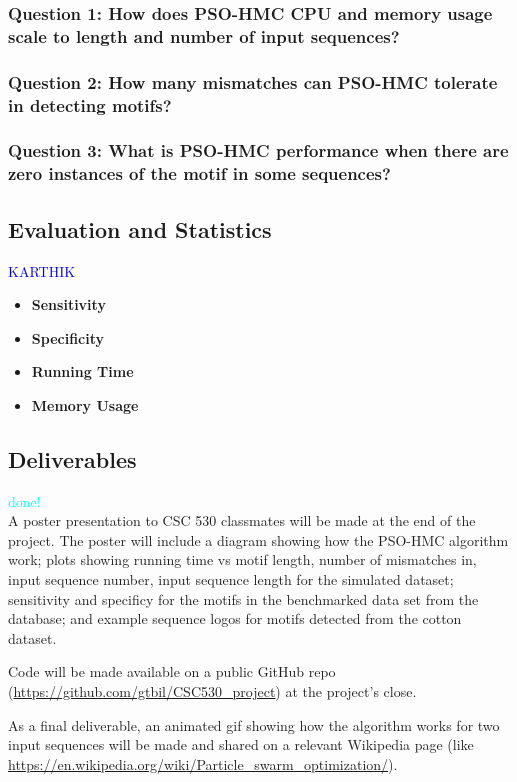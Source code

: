 \documentclass{article}
\begin{document}
\subsubsection{Question 1: How does PSO-HMC CPU and memory usage scale to length and number of input sequences?}
\subsubsection{Question 2: How many mismatches can PSO-HMC tolerate in detecting motifs?}
\subsubsection{Question 3: What is PSO-HMC performance when there are zero instances of the motif in some sequences?}
\subsection{Evaluation and Statistics}
\textcolor{blue}{KARTHIK} \\
\begin{itemize}
	\item \textbf{Sensitivity}
	\item \textbf{Specificity}
	\item \textbf{Running Time}
	\item \textbf{Memory Usage}
\end{itemize}
\subsection{Deliverables}
\textcolor{cyan}{done!} \\
A poster presentation to CSC 530 classmates will be made at the end of the project. The poster will include a diagram showing how the PSO-HMC algorithm work; plots showing running time vs motif length, number of mismatches in, input sequence number, input sequence length for the simulated dataset; sensitivity and specificy for the motifs in the benchmarked data set from the database; and example sequence logos for motifs detected from the cotton dataset.  
  
  Code will be made available on a public GitHub repo (\url{https://github.com/gtbil/CSC530_project}) at the project's close.  
  
  As a final deliverable, an animated gif showing how the algorithm works for two input sequences will be made and shared on a relevant Wikipedia page (like \url{https://en.wikipedia.org/wiki/Particle_swarm_optimization/}).
\end{document}
